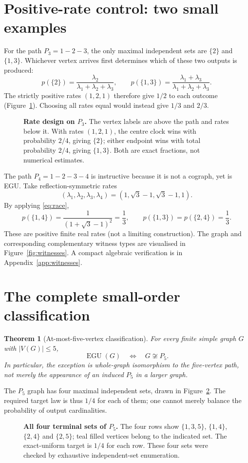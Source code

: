 \documentclass[11pt,a4paper]{article}
\newtheorem{theorem}{Theorem}
\newcommand{\EGU}{\operatorname{EGU}}
\begin{document}
\section{Positive-rate control: two small examples}
For the path $P_3=1-2-3$, the only maximal independent sets are $\{2\}$ and $\{1,3\}$.  Whichever vertex arrives first determines which of these two outputs is produced:
\[p(\{2\})=\frac{\lambda_2}{\lambda_1+\lambda_2+\lambda_3},\qquad p(\{1,3\})=\frac{\lambda_1+\lambda_3}{\lambda_1+\lambda_2+\lambda_3}.\]
The strictly positive rates $(1,2,1)$ therefore give $1/2$ to each outcome (Figure~\ref{fig:p3}).  Choosing all rates equal would instead give $1/3$ and $2/3$.

\begin{figure}[htbp]\centering\figpthree
\caption{\textbf{Rate design on $P_3$.}  The vertex labels are above the path and rates below it.  With rates $(1,2,1)$, the centre clock wins with probability $2/4$, giving $\{2\}$; either endpoint wins with total probability $2/4$, giving $\{1,3\}$.  Both are exact fractions, not numerical estimates.}\label{fig:p3}\end{figure}

The path $P_4=1-2-3-4$ is instructive because it is not a cograph, yet is EGU.  Take reflection-symmetric rates
\[(\lambda_1,\lambda_2,\lambda_3,\lambda_4)=(1,\sqrt3-1,\sqrt3-1,1).\]
By applying \eqref{eq:race},
\[p(\{1,4\})=\frac{1}{(1+\sqrt3-1)^2}=\frac13,\qquad p(\{1,3\})=p(\{2,4\})=\frac13.\]
These are positive finite real rates (not a limiting construction).  The graph and corresponding complementary witness types are visualised in Figure~\ref{fig:witnesses}.  A compact algebraic verification is in Appendix~\ref{app:witnesses}.

\section{The complete small-order classification}
\begin{theorem}[At-most-five-vertex classification]\label{thm:main}
For every finite simple graph $G$ with $|V(G)|\le5$,
\[\EGU(G)\quad\Longleftrightarrow\quad G\not\cong P_5.\]
In particular, the exception is \emph{whole-graph isomorphism} to the five-vertex path, not merely the appearance of an induced $P_5$ in a larger graph.
\end{theorem}

The $P_5$ graph has four maximal independent sets, drawn in Figure~\ref{fig:p5sets}.  The required target law is thus $1/4$ for each of them; one cannot merely balance the probability of output cardinalities.
\begin{figure}[htbp]\centering\figpfivesets
\caption{\textbf{All four terminal sets of $P_5$.}  The four rows show $\{1,3,5\}$, $\{1,4\}$, $\{2,4\}$ and $\{2,5\}$; teal filled vertices belong to the indicated set.  The exact-uniform target is $1/4$ for each row.  These four sets were checked by exhaustive independent-set enumeration.}\label{fig:p5sets}\end{figure}
\end{document}

